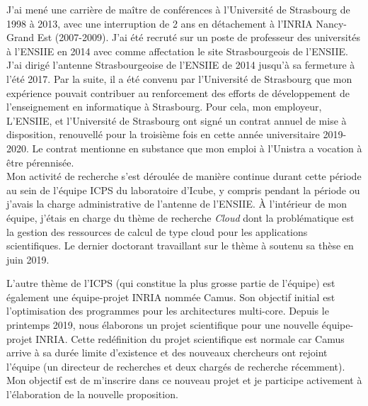

J'ai mené une carrière de maître  de conférences à l'Université de Strasbourg de
1998 à 2013, avec une interruption de 2 ans en détachement à l'INRIA Nancy-Grand
Est (2007-2009).  J'ai été recruté sur  un poste de professeur des universités à
l'ENSIIE  en 2014  avec comme  affectation le  site Strasbourgeois  de l'ENSIIE.
J'ai dirigé l'antenne Strasbourgeoise de l'ENSIIE de 2014 jusqu'à sa fermeture à
l'été 2017. Par  la suite, il a  été convenu par l'Université  de Strasbourg que
mon expérience pouvait  contribuer au renforcement des  efforts de développement
de  l'enseignement en  informatique  à Strasbourg.   Pour  cela, mon  employeur,
L'ENSIIE, et  l'Université de Strasbourg ont  signé un contrat annuel  de mise à
disposition,  renouvellé pour  la troisième  fois en  cette année  universitaire
2019-2020.   Le contrat  mentionne en  substance que  mon emploi  à l'Unistra  a
vocation à être pérennisée.\\

Mon  activité de  recherche  s'est  déroulée de  manière  continue durant  cette
période au  sein de l'équipe ICPS  du laboratoire d'Icube, y  compris pendant la
période  ou  j'avais  la  charge  administrative de  l'antenne  de  l'ENSIIE.  À
l'intérieur de mon équipe, j'étais en  charge du thème de recherche \emph{Cloud}
dont la problématique est la gestion des ressources de calcul de type cloud pour
les applications scientifiques. Le dernier  doctorant travaillant sur le thème à
soutenu sa thèse  en juin 2019. 

L'autre thème  de l'ICPS (qui constitue  la plus grosse partie  de l'équipe) est
également  une  équipe-projet INRIA  nommée  Camus.   Son objectif  initial  est
l'optimisation  des programmes  pour  les architectures  multi-core.  Depuis  le
printemps  2019,  nous  élaborons  un  projet  scientifique  pour  une  nouvelle
équipe-projet INRIA.  Cette redéfinition du  projet scientifique est normale car
Camus  arrive à  sa  durée limite  d'existence et  des  nouveaux chercheurs  ont
rejoint  l'équipe (un  directeur  de  recherches et  deux  chargés de  recherche
récemment).   Mon objectif  est  de  m'inscrire dans  ce  nouveau  projet et  je
participe activement à l'élaboration de la nouvelle proposition.

